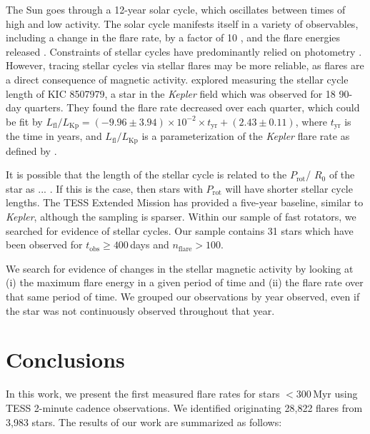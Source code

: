 \documentclass[twocolumn]{aastex631}
\begin{document}
The Sun goes through a 12-year solar cycle, which oscillates between times of high and low activity. The solar cycle manifests itself in a variety of observables, including a change in the flare rate, by a factor of 10 \citep{}, and the flare energies released \citep{}. Constraints of stellar cycles have predominantly relied on photometry \citep[see recent review by ][]{cycleReview}. However, tracing stellar cycles via stellar flares may be more reliable, as flares are a direct consequence of magnetic activity. \cite{} explored measuring the stellar cycle length of KIC 8507979, a star in the \textit{Kepler} field which was observed for 18 90-day quarters. They found the flare rate decreased over each quarter, which could be fit by $L_\textrm{fl}/L_\textrm{Kp} = (-9.96 \pm 3.94) \times 10^{-2} \times t_\textrm{yr} + (2.43 \pm 0.11)$, where $t_\textrm{yr}$ is the time in years, and $L_\textrm{fl}/L_\textrm{Kp}$ is a parameterization of the \textit{Kepler} flare rate as defined by \citep{Hawley14}.

It is possible that the length of the stellar cycle is related to the $P_\textrm{rot}$/ $R_0$ of the star as ... \citep{}. If this is the case, then stars with $P_\textrm{rot}$ will have shorter stellar cycle lengths. The TESS Extended Mission has provided a five-year baseline, similar to \textit{Kepler}, although the sampling is sparser. Within our sample of fast rotators, we searched for evidence of stellar cycles. Our sample contains 31 stars which have been observed for $t_\textrm{obs} \geq 400$\,days and $n_\textrm{flare} > 100$.

We search for evidence of changes in the stellar magnetic activity by looking at (i) the maximum flare energy in a given period of time and (ii) the flare rate over that same period of time. We grouped our observations by year observed, even if the star was not continuously observed throughout that year.


\section{Conclusions}\label{sec:conclusions}

In this work, we present the first measured flare rates for stars $< 300$\,Myr using
TESS 2-minute cadence observations. We identified originating 28,822 flares from
3,983 stars. The results of our work are summarized as follows:
\end{document}
